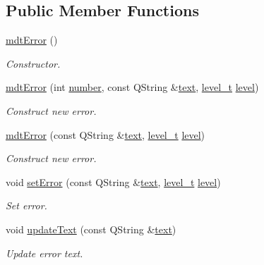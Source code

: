 \subsection*{Public Member Functions}
\begin{DoxyCompactItemize}
\item 
\hyperlink{classmdt_error_a78824dc8c0029107949baaf28c4a9df5}{mdt\-Error} ()
\begin{DoxyCompactList}\small\item\em Constructor. \end{DoxyCompactList}\item 
\hyperlink{classmdt_error_a377c175cc8e1aeae543cae2ecc5ca87b}{mdt\-Error} (int \hyperlink{classmdt_error_ad233adb8efe4180b85f584c5afdd49fc}{number}, const Q\-String \&\hyperlink{classmdt_error_a8630bb6b21b70edfe3d13eaff82a1baf}{text}, \hyperlink{classmdt_error_a5c8b1a040e2feaa848f6201d6b6f0cd7}{level\-\_\-t} \hyperlink{classmdt_error_a8d8382d3008de890689df415deb7766e}{level})
\begin{DoxyCompactList}\small\item\em Construct new error. \end{DoxyCompactList}\item 
\hyperlink{classmdt_error_a775542a251ef746f3433e7d790a48d85}{mdt\-Error} (const Q\-String \&\hyperlink{classmdt_error_a8630bb6b21b70edfe3d13eaff82a1baf}{text}, \hyperlink{classmdt_error_a5c8b1a040e2feaa848f6201d6b6f0cd7}{level\-\_\-t} \hyperlink{classmdt_error_a8d8382d3008de890689df415deb7766e}{level})
\begin{DoxyCompactList}\small\item\em Construct new error. \end{DoxyCompactList}\item 
void \hyperlink{classmdt_error_a8e7961a665841c1b052116e4dd2eb855}{set\-Error} (const Q\-String \&\hyperlink{classmdt_error_a8630bb6b21b70edfe3d13eaff82a1baf}{text}, \hyperlink{classmdt_error_a5c8b1a040e2feaa848f6201d6b6f0cd7}{level\-\_\-t} \hyperlink{classmdt_error_a8d8382d3008de890689df415deb7766e}{level})
\begin{DoxyCompactList}\small\item\em Set error. \end{DoxyCompactList}\item 
void \hyperlink{classmdt_error_ace38a9600c19ddf3628d46b1a6a7b414}{update\-Text} (const Q\-String \&\hyperlink{classmdt_error_a8630bb6b21b70edfe3d13eaff82a1baf}{text})
\begin{DoxyCompactList}\small\item\em Update error text. \end{DoxyCompactList}\item 

\end{DoxyCompactItemize}

